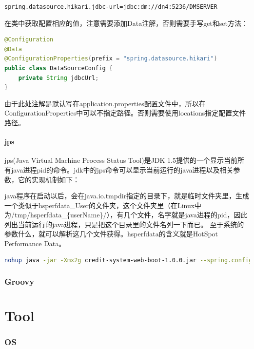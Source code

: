 \documentclass[letter]{book}
\begin{document}
\begin{lstlisting}
spring.datasource.hikari.jdbc-url=jdbc:dm://dn4:5236/DMSERVER
\end{lstlisting}

在类中获取配置相应的值，注意需要添加Data注解，否则需要手写get和set方法：

\begin{lstlisting}[language=Java]
@Configuration
@Data
@ConfigurationProperties(prefix = "spring.datasource.hikari")
public class DataSourceConfig {
	private String jdbcUrl;
}
\end{lstlisting}

由于此处注解是默认写在application.properties配置文件中，所以在ConfigurationProperties中可以不指定路径。否则需要使用locations指定配置文件路径。

\subsection{jps}

jps(Java Virtual Machine Process Status Tool)是JDK 1.5提供的一个显示当前所有java进程pid的命令。jdk中的jps命令可以显示当前运行的java进程以及相关参数，它的实现机制如下：

java程序在启动以后，会在java.io.tmpdir指定的目录下，就是临时文件夹里，生成一个类似于hsperfdata\_User的文件夹，这个文件夹里（在Linux中为/tmp/hsperfdata\_\{userName\}/），有几个文件，名字就是java进程的pid，因此列出当前运行的java进程，只是把这个目录里的文件名列一下而已。 至于系统的参数什么，就可以解析这几个文件获得。hsperfdata的含义就是HotSpot Performance Data。

\begin{lstlisting}[language=Bash]
nohup java -jar -Xmx2g credit-system-web-boot-1.0.0.jar --spring.config.location=application-jenkins.properties &
\end{lstlisting}


\newpage
\section*{Groovy}

\part{Tool}

\newpage

\section{OS}
\end{document}
